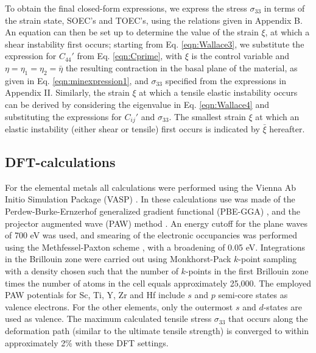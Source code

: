 \documentclass[showpacs,aps,floatfix,prb,reprint,superscriptaddress]{revtex4-1}
\begin{document}
To obtain the final closed-form expressions, we express the stress $\sigma_{33}$ in terms of the strain state, SOEC's and TOEC's, using the relations given in Appendix B.  An equation can then be set up to determine the value of the strain $\xi$, at which a shear instability first occurs; starting from Eq. \ref{eqn:Wallace3}, we substitute the expression for $C_{44}'$ from Eq. \ref{eqn:Cprime}, with $\xi$ is the control variable and $\eta = \eta_{1} = \eta_{2} = \bar{\eta}$ the resulting contraction in the basal plane of the material, as given in Eq. \ref{eqn:minexpression1}, and $\sigma_{33}$ specified from the expressions in Appendix II.  Similarly, the strain $\xi$ at which a tensile elastic instability occurs can be derived by considering the eigenvalue in Eq. \ref{eqn:Wallace4} and substituting the expressions for $C_{ij}'$ and $\sigma_{33}$. The smallest strain $\xi$ at which an elastic instability (either shear or tensile) first occurs is indicated by $\bar{\xi}$ hereafter.



\subsection{DFT-calculations}
For the elemental metals all calculations were performed using the Vienna Ab Initio Simulation Package (VASP) \cite{PhysRevB.54.11169,PhysRevB.47.558}. In these calculations use was made of the Perdew-Burke-Ernzerhof generalized gradient functional (PBE-GGA) \cite{PhysRevLett.77.3865}, and the projector augmented wave (PAW) method \cite{PhysRevB.50.17953,PhysRevB.59.1758}.  An energy cutoff for the plane waves of 700 eV was used, and smearing of the electronic occupancies was performed using the Methfessel-Paxton scheme \cite{PhysRevB.40.3616}, with a broadening of 0.05 eV.  Integrations in the Brillouin zone were carried out using Monkhorst-Pack $k$-point sampling \cite{PhysRevB.13.5188} with a density chosen such that the number of $k$-points in the first Brillouin zone times the number of atoms in the cell equals approximately 25,000. The employed PAW potentials for Sc, Ti, Y, Zr and Hf include $s$ and $p$ semi-core states as valence electrons. For the other elements, only the outermost $s$ and $d$-states are used as valence. The maximum calculated tensile stress $\sigma_{33}$ that occurs along the deformation path (similar to the ultimate tensile strength) is converged to within approximately 2\% with these DFT settings.
\end{document}
